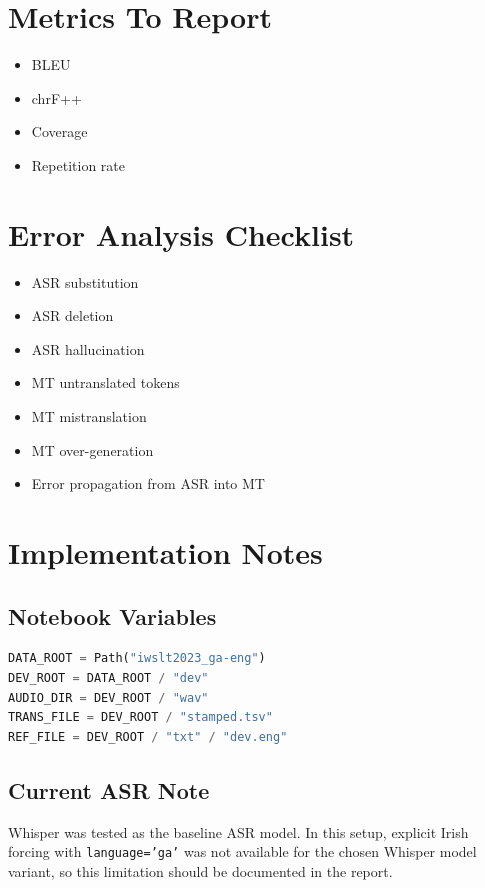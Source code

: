 \documentclass[11pt,a4paper]{article}
\begin{document}
\section{Metrics To Report}

\begin{itemize}[leftmargin=1.4em]
  \item BLEU
  \item chrF++
  \item Coverage
  \item Repetition rate
\end{itemize}

\section{Error Analysis Checklist}

\begin{itemize}[leftmargin=1.4em]
  \item ASR substitution
  \item ASR deletion
  \item ASR hallucination
  \item MT untranslated tokens
  \item MT mistranslation
  \item MT over-generation
  \item Error propagation from ASR into MT
\end{itemize}

\section{Implementation Notes}

\subsection{Notebook Variables}

\begin{lstlisting}[language=Python, caption={Current dataset path setup}]
DATA_ROOT = Path("iwslt2023_ga-eng")
DEV_ROOT = DATA_ROOT / "dev"
AUDIO_DIR = DEV_ROOT / "wav"
TRANS_FILE = DEV_ROOT / "stamped.tsv"
REF_FILE = DEV_ROOT / "txt" / "dev.eng"
\end{lstlisting}

\subsection{Current ASR Note}

Whisper was tested as the baseline ASR model. In this setup, explicit Irish forcing with \texttt{language='ga'} was not available for the chosen Whisper model variant, so this limitation should be documented in the report.
\end{document}
